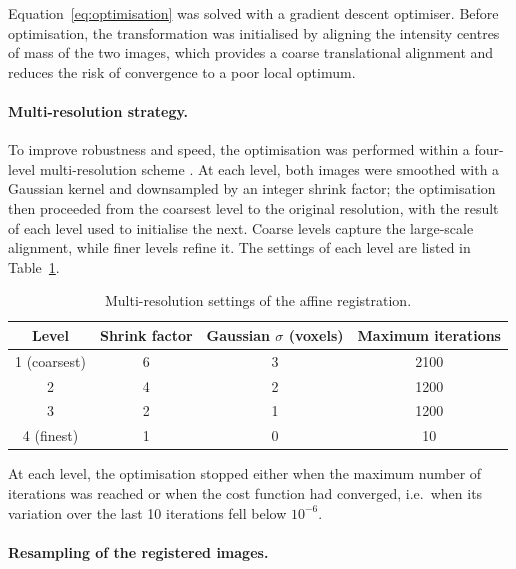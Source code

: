 Equation~\eqref{eq:optimisation} was solved with a gradient descent optimiser.
Before optimisation, the transformation was initialised by aligning the
intensity centres of mass of the two images, which provides a coarse
translational alignment and reduces the risk of convergence to a poor local
optimum.

\paragraph{Multi-resolution strategy.}  %

To improve robustness and speed, the optimisation was performed within a
four-level multi-resolution scheme \cite{thevenaz1998pyramid}. At each level,
both images were smoothed with a Gaussian kernel and downsampled by an integer
shrink factor; the optimisation then proceeded from the coarsest level to the
original resolution, with the result of each level used to initialise the next.
Coarse levels capture the large-scale alignment, while finer levels refine it.
The settings of each level are listed in Table~\ref{tab:multires}.

\begin{table}[htbp]              %
  \centering                     %
  \caption{Multi-resolution settings of the affine registration.}
  \label{tab:multires}           %
  \begin{tabular}{cccc}          %
    \toprule
    Level & Shrink factor & Gaussian $\sigma$ (voxels) & Maximum iterations \\
    \midrule
    1 (coarsest) & 6 & 3 & 2100 \\
    2            & 4 & 2 & 1200 \\
    3            & 2 & 1 & 1200 \\
    4 (finest)   & 1 & 0 & 10   \\
    \bottomrule
  \end{tabular}
\end{table}

At each level, the optimisation stopped either when the maximum number of
iterations was reached or when the cost function had converged, i.e.\ when its
variation over the last 10 iterations fell below $10^{-6}$.

\paragraph{Resampling of the registered images.}  %

